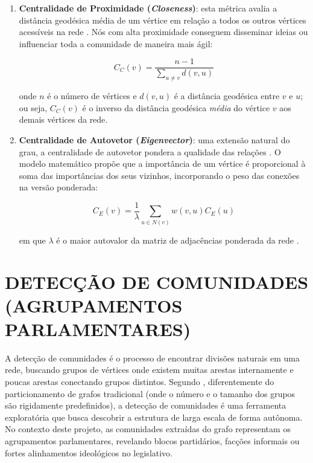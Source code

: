 \documentclass[
      12pt,
      a4paper,
      openright,
      oneside,
      chapter=TITLE,
      section=TITLE,
      english,
      french,
      spanish,
      brazilian
    ]{abntex2}
\begin{document}
\begin{enumerate}[label=\alph*)]
        \begin{equation}
        C_B(v) = \sum_{s \neq v \neq t} \frac{\sigma_{st}(v)}{\sigma_{st}}
        \label{eq:betweenness}
        \end{equation}
    
        onde $C_B(v)$ é a fração de caminhos mínimos entre todos os pares que passam por $v$ \cite{freeman1977, brandes2001}.
        
        \item \textbf{Centralidade de Proximidade (\textit{Closeness})}: esta métrica avalia a distância geodésica média de um vértice em relação a todos os outros vértices acessíveis na rede \cite{brandes2001, newman2010}. Nós com alta proximidade conseguem disseminar ideias ou influenciar toda a comunidade de maneira mais ágil:
    
        \begin{equation}
        C_C(v) = \frac{n-1}{\sum_{u \neq v} d(v,u)}
        \label{eq:closeness}
        \end{equation}
    
        onde $n$ é o número de vértices e $d(v,u)$ é a distância geodésica entre $v$ e $u$; ou seja, $C_C(v)$ é o inverso da distância geodésica \emph{média} do vértice $v$ aos demais vértices da rede.
        
        \item \textbf{Centralidade de Autovetor (\textit{Eigenvector})}: uma extensão natural do grau, a centralidade de autovetor pondera a qualidade das relações \cite{bonacich1972, newman2010}. O modelo matemático propõe que a importância de um vértice é proporcional à soma das importâncias dos seus vizinhos, incorporando o peso das conexões na versão ponderada:
    
        \begin{equation}
        C_E(v) = \frac{1}{\lambda} \sum_{u \in N(v)} w(v,u) C_E(u)
        \label{eq:eigenvector}
        \end{equation}
    
        em que $\lambda$ é o maior autovalor da matriz de adjacências ponderada da rede \cite{bonacich1987}.
    \end{enumerate}
    
    \section{DETECÇÃO DE COMUNIDADES (AGRUPAMENTOS PARLAMENTARES)}
    
    A detecção de comunidades é o processo de encontrar divisões naturais em uma rede, buscando grupos de vértices onde existem muitas arestas internamente e poucas arestas conectando grupos distintos. Segundo , diferentemente do particionamento de grafos tradicional (onde o número e o tamanho dos grupos são rigidamente predefinidos), a detecção de comunidades é uma ferramenta exploratória que busca descobrir a estrutura de larga escala de forma autônoma. No contexto deste projeto, as comunidades extraídas do grafo representam os agrupamentos parlamentares, revelando blocos partidários, facções informais ou fortes alinhamentos ideológicos no legislativo.
    
\end{document}
